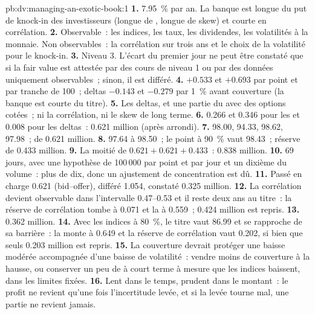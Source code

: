 \begin{solution}{pb:dv:managing-an-exotic-book:1}
\textbf{1.} 7.95~\% par an. La banque est longue du put de knock-in des investisseurs (longue de , longue de skew) et courte en corrélation.
\textbf{2.} Observable~: les indices, les taux, les dividendes, les volatilités à la monnaie. Non observables~: la corrélation sur trois ans et le choix de la volatilité pour le knock-in.
\textbf{3.} Niveau 3. L'écart du premier jour ne peut être constaté que si la fair value est attestée par des cours de niveau 1 ou par des données uniquement observables~; sinon, il est différé.
\textbf{4.}  $+0.533$ et $+0.693$ par point et par tranche de 100~; deltas $-0.143$ et $-0.279$ par 1~\% avant couverture (la banque est courte du titre).
\textbf{5.} Les deltas, et une partie du  avec des options cotées~; ni la corrélation, ni le skew de long terme.
\textbf{6.} 0.266 et 0.346 pour les  et 0.008 pour les deltas~: 0.621 million (après arrondi).
\textbf{7.} 98.00, 94.33, 98.62, 97.98~;  de 0.621 million.
\textbf{8.} 97.64 à 98.50~; le point à 90~\% vaut 98.43~; réserve de 0.433 million.
\textbf{9.} La moitié de $0.621+0.621+0.433$~: 0.838 million.
\textbf{10.} 69 jours, avec une hypothèse de 100\,000 par point et par jour et un dixième du volume~: plus de dix, donc un ajustement de concentration est dû.
\textbf{11.} Passé en charge 0.621 (bid--offer), différé 1.054, constaté 0.325 million.
\textbf{12.} La corrélation devient observable dans l'intervalle 0.47--0.53 et il reste deux ans au titre~: la réserve de corrélation tombe à 0.071 et la  à 0.559~; 0.424
million est repris.
\textbf{13.} 0.362 million.
\textbf{14.} Avec les indices à 80~\%, le titre vaut 86.99 et se rapproche de sa barrière~: la  monte à 0.649 et la réserve de corrélation vaut 0.202, si bien que seuls 0.203
million est repris.
\textbf{15.} La couverture devrait protéger une baisse modérée accompagnée d'une baisse de volatilité~: vendre moins de couverture à la hausse, ou conserver un peu de  à court terme à mesure que les indices baissent, dans les limites fixées.
\textbf{16.} Lent dans le temps, prudent dans le montant~: le profit ne revient qu'une fois l'incertitude levée, et si la levée tourne mal, une partie ne revient jamais.

\end{solution}
